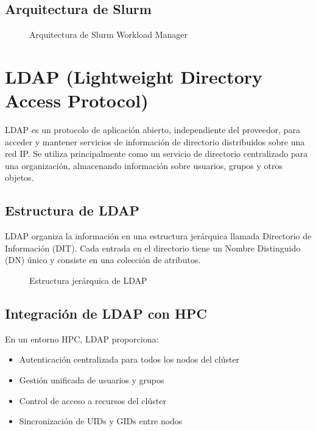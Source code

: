\documentclass[12pt,a4paper]{report}
\begin{document}
\subsection{Arquitectura de Slurm}

\begin{figure}[H]
\centering
\caption{Arquitectura de Slurm Workload Manager}
\label{fig:slurm_architecture}
\end{figure}

\section{LDAP (Lightweight Directory Access Protocol)}

LDAP es un protocolo de aplicación abierto, independiente del proveedor, para acceder y mantener servicios de información de directorio distribuidos sobre una red IP. Se utiliza principalmente como un servicio de directorio centralizado para una organización, almacenando información sobre usuarios, grupos y otros objetos.

\subsection{Estructura de LDAP}

LDAP organiza la información en una estructura jerárquica llamada Directorio de Información (DIT). Cada entrada en el directorio tiene un Nombre Distinguido (DN) único y consiste en una colección de atributos.

\begin{figure}[H]
\centering
\caption{Estructura jerárquica de LDAP}
\label{fig:ldap_structure}
\end{figure}

\subsection{Integración de LDAP con HPC}

En un entorno HPC, LDAP proporciona:

\begin{itemize}
    \item Autenticación centralizada para todos los nodos del clúster
    \item Gestión unificada de usuarios y grupos
    \item Control de acceso a recursos del clúster
    \item Sincronización de UIDs y GIDs entre nodos
\end{itemize}
\end{document}
